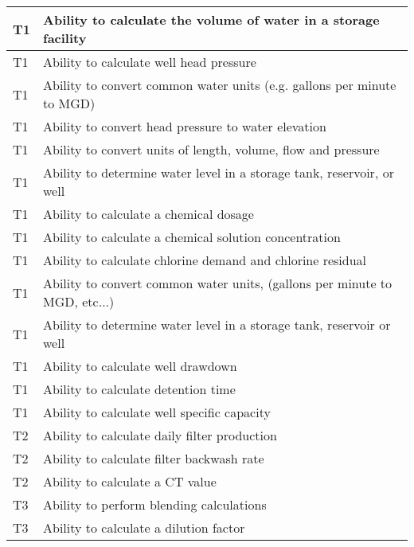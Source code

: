 \begin{table}[H]
\begin{tabular}{| m{1cm} |m{15cm} |}
T1 & Ability to calculate   the volume of water in a storage facility             \\ \hline
T1 & Ability to calculate   well head pressure                                    \\ \hline
T1 & Ability to convert   common water units (e.g. gallons per minute to MGD)     \\ \hline
T1 & Ability to convert   head pressure to water elevation                        \\ \hline
T1 & Ability to convert   units of length, volume, flow and pressure              \\ \hline
T1 & Ability to determine   water level in a storage tank, reservoir, or well     \\ \hline
T1 & Ability to calculate   a chemical dosage                                     \\ \hline
T1 & Ability to calculate   a chemical solution concentration                     \\ \hline
T1 & Ability to calculate   chlorine demand and chlorine residual                 \\ \hline
T1 & Ability to convert   common water units, (gallons per minute to MGD, etc...) \\ \hline
T1 & Ability to determine   water level in a storage tank, reservoir or well      \\ \hline
T1 & Ability to calculate   well drawdown                                                                                              \\ \hline
T1 & Ability to calculate   detention time                                                                                             \\ \hline
T1 & Ability to calculate   well specific capacity                                                                                     \\ \hline
T2 & Ability to calculate   daily filter production                               \\ \hline
T2 & Ability to calculate   filter backwash rate                                  \\ \hline
T2 & Ability to calculate   a CT value                                            \\ \hline
T3 & Ability to perform   blending calculations                                   \\ \hline
T3 & Ability to calculate   a dilution factor                                     \\ \hline

\end{tabular}
\end{table}
